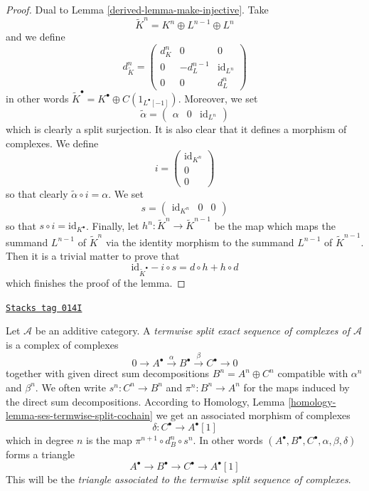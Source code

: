 \begin{proof}

Dual to Lemma \ref{derived-lemma-make-injective}.
Take
$$
\tilde K^n = K^n \oplus L^{n - 1} \oplus L^n
$$
and we define
$$
d^n_{\tilde K} =
\left(
\begin{matrix}
d^n_K & 0 & 0 \\
0 & - d^{n - 1}_L & \text{id}_{L^n} \\
0 & 0 & d^n_L
\end{matrix}
\right)
$$
in other words $\tilde K^\bullet = K^\bullet \oplus C(1_{L^\bullet[-1]})$.
Moreover, we set
$$
\tilde \alpha =
\left(
\begin{matrix}
\alpha &
0 &
\text{id}_{L^n}
\end{matrix}
\right)
$$
which is clearly a split surjection. It is also clear that it defines a
morphism of complexes. We define
$$
i =
\left(
\begin{matrix}
\text{id}_{K^n} \\
0 \\
0
\end{matrix}
\right)
$$
so that clearly $\tilde \alpha \circ i = \alpha$. We set
$$
s =
\left(
\begin{matrix}
\text{id}_{K^n} &
0 &
0
\end{matrix}
\right)
$$
so that $s \circ i = \text{id}_{K^\bullet}$. Finally,
let $h^n : \tilde K^n \to \tilde K^{n - 1}$ be the map
which maps the summand $L^{n - 1}$ of $\tilde K^n$ via the identity morphism
to the summand $L^{n - 1}$ of $\tilde K^{n - 1}$. Then it is a trivial matter
to prove that
$$
\text{id}_{\tilde K^\bullet} - i \circ s
=
d \circ h + h \circ d
$$
which finishes the proof of the lemma.
\end{proof}

\begin{definition}
\label{derived-definition-split-ses}
\href{https://stacks.math.columbia.edu/tag/014I}{\texttt{Stacks tag 014I}}

Let $\mathcal{A}$ be an additive category.
A {\it termwise split exact sequence of complexes of $\mathcal{A}$}
is a complex of complexes
$$
0 \to
A^\bullet \xrightarrow{\alpha}
B^\bullet \xrightarrow{\beta}
C^\bullet \to 0
$$
together with given direct sum decompositions
$B^n = A^n \oplus C^n$
compatible with $\alpha^n$ and $\beta^n$.
We often write $s^n : C^n \to B^n$ and $\pi^n : B^n \to A^n$
for the maps induced by the direct sum decompositions.
According to
Homology, Lemma \ref{homology-lemma-ses-termwise-split-cochain}
we get an associated morphism of complexes
$$
\delta : C^\bullet \longrightarrow A^\bullet[1]
$$
which in degree $n$ is the map $\pi^{n + 1} \circ d_B^n \circ s^n$.
In other words
$(A^\bullet, B^\bullet, C^\bullet, \alpha, \beta, \delta)$
forms a triangle
$$
A^\bullet \to B^\bullet \to C^\bullet \to A^\bullet[1]
$$
This will be the {\it triangle associated to the termwise
split sequence of complexes}.
\end{definition}

